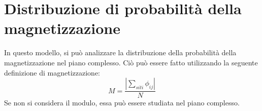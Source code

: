\section{Distribuzione di probabilità della magnetizzazione}
In questo modello, si può analizzare la distribuzione della probabilità della magnetizzazione nel piano complesso.
Ciò può essere fatto utilizzando la seguente definizione di magnetizzazione:
$$
	 M = \frac{| \sum_{siti} \phi_{i j} |}{N} 
$$
Se non si considera il modulo, essa può essere studiata nel piano complesso.\\
\begin{center}
\begin{figure}[h!]
\centering


\end{figure}
\end{center}

